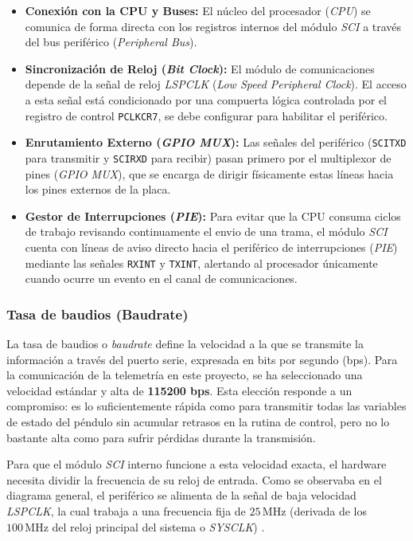 \documentclass[11pt,fleqn]{book} %
\begin{document}
\begin{itemize}
	\item \textbf{Conexión con la CPU y Buses:} El núcleo del procesador (\textit{CPU}) se comunica de forma directa con los registros internos del módulo \textit{SCI} a través del bus periférico (\textit{Peripheral Bus}). 
	
	\item \textbf{Sincronización de Reloj (\textit{Bit Clock}):} El módulo de comunicaciones depende de la señal de reloj \textit{LSPCLK} (\textit{Low Speed Peripheral Clock}). El acceso a esta señal está condicionado por una compuerta lógica controlada por el registro de control \texttt{PCLKCR7}, se debe configurar para habilitar el periférico.
	
	\item \textbf{Enrutamiento Externo (\textit{GPIO MUX}):} Las señales del periférico (\texttt{SCITXD} para transmitir y \texttt{SCIRXD} para recibir) pasan primero por el multiplexor de pines (\textit{GPIO MUX}), que se encarga de dirigir físicamente estas líneas hacia los pines externos de la placa.
	
	\item \textbf{Gestor de Interrupciones (\textit{PIE}):} Para evitar que la CPU consuma ciclos de trabajo revisando continuamente el envio de una trama, el módulo \textit{SCI} cuenta con líneas de aviso directo hacia el periférico de interrupciones (\textit{PIE}) mediante las señales \texttt{RXINT} y \texttt{TXINT}, alertando al procesador únicamente cuando ocurre un evento en el canal de comunicaciones.
\end{itemize}

\subsubsection{Tasa de baudios (Baudrate)}

La tasa de baudios o \textit{baudrate} define la velocidad a la que se transmite la información a través del puerto serie, expresada en bits por segundo (bps). Para la comunicación de la telemetría en este proyecto, se ha seleccionado una velocidad estándar y alta de \textbf{115200 bps}. Esta elección responde a un compromiso: es lo suficientemente rápida como para transmitir todas las variables de estado del péndulo sin acumular retrasos en la rutina de control, pero no lo bastante alta como para sufrir pérdidas durante la transmisión.

Para que el módulo \textit{SCI} interno funcione a esta velocidad exacta, el hardware necesita dividir la frecuencia de su reloj de entrada. Como se observaba en el diagrama general, el periférico se alimenta de la señal de baja velocidad \textit{LSPCLK}, la cual trabaja a una frecuencia fija de $25\,\text{MHz}$ (derivada de los $100\,\text{MHz}$ del reloj principal del sistema o \textit{SYSCLK}) \cite{ti_f28004x_trm}. 
\end{document}
